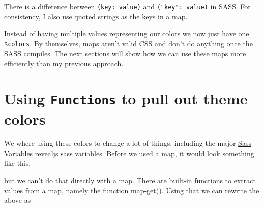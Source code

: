 \documentclass[
  letterpaper,
  DIV=11,
  numbers=noendperiod]{scrreprt}
\newenvironment{Shaded}{\begin{snugshade}}{\end{snugshade}}
\newcommand{\NormalTok}[1]{\textcolor[rgb]{0.00,0.23,0.31}{#1}}
\newcommand{\OperatorTok}[1]{\textcolor[rgb]{0.37,0.37,0.37}{#1}}
\newcommand{\VariableTok}[1]{\textcolor[rgb]{0.07,0.07,0.07}{#1}}
\begin{document}
\begin{tcolorbox}[enhanced jigsaw, titlerule=0mm, bottomrule=.15mm, opacityback=0, colbacktitle=quarto-callout-note-color!10!white, colframe=quarto-callout-note-color-frame, coltitle=black, breakable, toprule=.15mm, colback=white, bottomtitle=1mm, title=\textcolor{quarto-callout-note-color}{\faInfo}\hspace{0.5em}{Note}, toptitle=1mm, arc=.35mm, left=2mm, leftrule=.75mm, rightrule=.15mm, opacitybacktitle=0.6]

There is a difference between \texttt{(key:\ value)} and
\texttt{("key":\ value)} in SASS. For consistency, I also use quoted
strings as the keys in a map.

\end{tcolorbox}

Instead of having multiple values representing our colors we now just
have one \texttt{\$colors}. By themselves, maps aren't valid CSS and
don't do anything once the SASS compiles. The next sections will show
how we can use these maps more efficiently than my previous approach.

\section{\texorpdfstring{Using \texttt{Functions} to pull out theme
colors}{Using Functions to pull out theme colors}}\label{using-functions-to-pull-out-theme-colors}

We where using these colors to change a lot of things, including the
major
\href{https://quarto.org/docs/presentations/revealjs/themes.html\#sass-variables}{Sass
Variables} revealjs sass variables. Before we used a map, it would look
something like this:

\begin{Shaded}
\end{Shaded}

but we can't do that directly with a map. There are built-in functions
to extract values from a map, namely the function
\href{https://sass-lang.com/documentation/values/maps/\#look-up-a-value}{map-get()}.
Using that we can rewrite the above as
\end{document}
